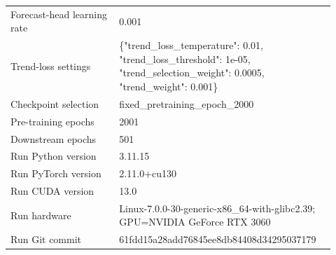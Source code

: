 \begin{table}[p]
\begin{tabular}{p{0.32\linewidth}p{0.60\linewidth}}
Forecast-head learning rate & 0.001 \\
Trend-loss settings & \{"trend\_loss\_temperature": 0.01, "trend\_loss\_threshold": 1e-05, "trend\_selection\_weight": 0.0005, "trend\_weight": 0.001\} \\
Checkpoint selection & fixed\_pretraining\_epoch\_2000 \\
Pre-training epochs & 2001 \\
Downstream epochs & 501 \\
Run Python version & 3.11.15 \\
Run PyTorch version & 2.11.0+cu130 \\
Run CUDA version & 13.0 \\
Run hardware & Linux-7.0.0-30-generic-x86\_64-with-glibc2.39; GPU=NVIDIA GeForce RTX 3060 \\
Run Git commit & 61fdd15a28add76845ee8db84408d34295037179 \\
\bottomrule
\end{tabular}
\end{table}
